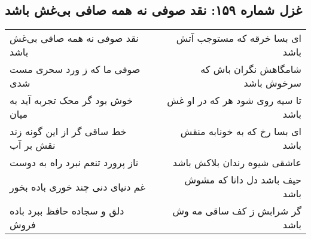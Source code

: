 \begin{center}
\section*{غزل شماره ۱۵۹: نقد صوفی نه همه صافی بی‌غش باشد}
\label{sec:sh159}
\begin{longtable}{l p{0.5cm} r}
نقد صوفی نه همه صافی بی‌غش باشد
&&
ای بسا خرقه که مستوجب آتش باشد
\\
صوفی ما که ز ورد سحری مست شدی
&&
شامگاهش نگران باش که سرخوش باشد
\\
خوش بود گر محک تجربه آید به میان
&&
تا سیه روی شود هر که در او غش باشد
\\
خط ساقی گر از این گونه زند نقش بر آب
&&
ای بسا رخ که به خونابه منقش باشد
\\
ناز پرورد تنعم نبرد راه به دوست
&&
عاشقی شیوه رندان بلاکش باشد
\\
غم دنیای دنی چند خوری باده بخور
&&
حیف باشد دل دانا که مشوش باشد
\\
دلق و سجاده حافظ ببرد باده فروش
&&
گر شرابش ز کف ساقی مه وش باشد
\\
\end{longtable}
\end{center}
